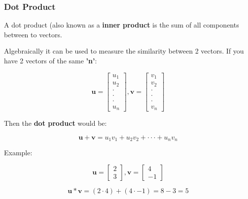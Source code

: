 \documentclass[12pt]{article}
\begin{document}
        \subsubsection{Dot Product}
            A dot product (also known as a \textbf{inner product} is the sum of all components between to vectors.

            Algebraically it can be used to measure the similarity between 2 vectors.
            If you have 2 vectors of the same \textbf{'n'}:

            \begin{equation}
                \textbf{u} = \begin{bmatrix} u_1 \\ u_2 \\ \cdot \\ \cdot \\ \cdot \\ u_n \end{bmatrix},
                \textbf{v} = \begin{bmatrix} v_1 \\ v_2 \\ \cdot \\ \cdot \\ \cdot \\ v_n \end{bmatrix} 
            \end{equation}

            Then the \textbf{dot product} would be:

            \begin{equation}
                \textbf{u} + \textbf{v} = u_1v_1 + u_2v_2 +\cdot \cdot \cdot + u_nv_n
            \end{equation}

            \newpage
            Example:

            \begin{equation}
                \textbf{u} = \begin{bmatrix} 2 \\ 3 \end{bmatrix},
                \textbf{v} = \begin{bmatrix} 4 \\ -1 \end{bmatrix}
            \end{equation}

            \begin{equation}
                \textbf{u} * \textbf{v} = (2 \cdot 4) + (4 \cdot -1) = 8 -3 = 5
            \end{equation}
\end{document}
